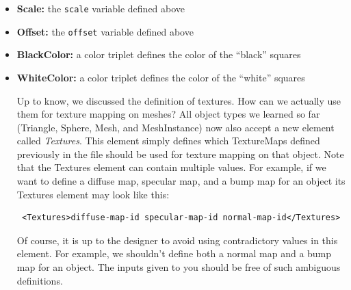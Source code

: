\documentclass[12pt]{article}
\begin{document}
\begin{itemize}
\begin{itemize}
\begin{verbatim}
bool xorXY = x != y;

if (xorXY != z) 
    return black; 
else 
    return white; 
\end{verbatim}

Here, the \texttt{pos} variable is the 3D point at which we are calculating the
texture value. \texttt{offset} controls the starting point of the
pattern. By changing the offset, you can shift the pattern in the 3D
space. \texttt{scale} controls the size of the checkerboard squares.
\texttt{black} and \texttt{white} define the colors of the checkerboard
squares -- they do not have to be black and white: you can define a
purple and orange checkerboard if it suits your taste. These parameters
are defined using the following XML elements:

\item \textbf{Scale:} the \texttt{scale} variable defined above
\item \textbf{Offset:} the \texttt{offset} variable defined above
\item \textbf{BlackColor:} a color triplet defines the color of the
``black'' squares
\item \textbf{WhiteColor:} a color triplet defines the color of the
``white'' squares

Up to know, we discussed the definition of textures. How can we
actually use them for texture mapping on meshes? All object types we
learned so far (Triangle, Sphere, Mesh, and MeshInstance) now also
accept a new element called \emph{Textures}. This element simply
defines which TextureMaps defined previously in the file should be
used for texture mapping on that object. Note that the Textures
element can contain multiple values. For example, if we want to define
a diffuse map, specular map, and a bump map for an object its
Textures element may look like this:

\begin{verbatim}
 <Textures>diffuse-map-id specular-map-id normal-map-id</Textures>
\end{verbatim}

Of course, it is up to the designer to avoid using contradictory
values in this element. For example, we shouldn't define both a normal map
and a bump map for an object. The inputs given to you should be free
of such ambiguous definitions.

\end{itemize}


\end{itemize}
\end{document}
